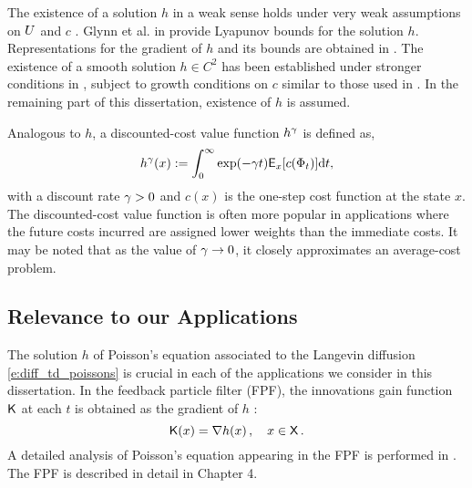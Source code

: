 The existence of a solution $h$ in a weak sense holds under very weak assumptions on $U$ and $c$  \cite{glymey96a,konmey12a}.  Glynn et al. in \cite{glymey96a} provide Lyapunov bounds for the solution $h$.  Representations for the gradient of $h$ and its bounds are obtained in \cite{laumehmeyrag15,devkonmey17b}.   The existence of  a  smooth solution $h\in C^2$ has been established under stronger conditions in \cite{parver01}, subject to growth conditions on $c$ similar to those used in  \cite{glymey96a}. In the remaining part of this dissertation, existence of $h$ is assumed. 

Analogous to $h$, a discounted-cost value function $h^\gamma$ is defined as,
\begin{equation}
h^\discount(x) := \int_0^\infty \exp(-\discount t )\Expect_x[c(\markovstate_t)] \ud t, 
\label{e:diff_td_discount_value_fn}
\end{equation}
with a discount rate $\gamma  >0$ and $c(x)$ is the one-step cost function at the state $x$. The discounted-cost value function is often more popular in applications where the future costs incurred are assigned lower weights than the immediate costs. It may be noted that as the value of $\gamma \to 0$, it closely approximates an average-cost problem. 

\subsection{Relevance to our Applications} 
The solution $h$ of Poisson's equation associated to the Langevin diffusion \eqref{e:diff_td_poissons} is crucial in each of the applications we consider in this dissertation. In the feedback particle filter (FPF), the innovations gain function $\text{\sf K}$ at each $t$ is obtained as  the gradient of $h$ \cite{yanmehmey13}:
\begin{equation}
\kFPF (x) = \nabla h(x)\, ,  \quad x\in\state\, .
\label{e:diff_td_fpfgain}
\end{equation}
A detailed analysis of Poisson's equation appearing in the FPF is performed in \cite{laumehmeyrag15}. The FPF is described in detail in Chapter 4. %

